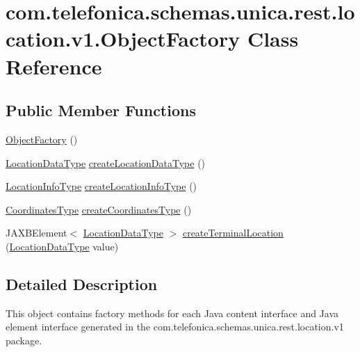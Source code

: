 \hypertarget{classcom_1_1telefonica_1_1schemas_1_1unica_1_1rest_1_1location_1_1v1_1_1ObjectFactory}{
\section{com.telefonica.schemas.unica.rest.location.v1.ObjectFactory Class Reference}
\label{classcom_1_1telefonica_1_1schemas_1_1unica_1_1rest_1_1location_1_1v1_1_1ObjectFactory}
}
\subsection*{Public Member Functions}
\begin{DoxyCompactItemize}
\item 
\hyperlink{classcom_1_1telefonica_1_1schemas_1_1unica_1_1rest_1_1location_1_1v1_1_1ObjectFactory_a7065b25df4fd0546046692b6a4e3af7e}{ObjectFactory} ()
\item 
\hyperlink{classcom_1_1telefonica_1_1schemas_1_1unica_1_1rest_1_1location_1_1v1_1_1LocationDataType}{LocationDataType} \hyperlink{classcom_1_1telefonica_1_1schemas_1_1unica_1_1rest_1_1location_1_1v1_1_1ObjectFactory_a0a78b76f6ff91e78009deda444c2b8f9}{createLocationDataType} ()
\item 
\hyperlink{classcom_1_1telefonica_1_1schemas_1_1unica_1_1rest_1_1location_1_1v1_1_1LocationInfoType}{LocationInfoType} \hyperlink{classcom_1_1telefonica_1_1schemas_1_1unica_1_1rest_1_1location_1_1v1_1_1ObjectFactory_aabe8e41e77b0503c98c8d6abec9b3e8c}{createLocationInfoType} ()
\item 
\hyperlink{classcom_1_1telefonica_1_1schemas_1_1unica_1_1rest_1_1location_1_1v1_1_1CoordinatesType}{CoordinatesType} \hyperlink{classcom_1_1telefonica_1_1schemas_1_1unica_1_1rest_1_1location_1_1v1_1_1ObjectFactory_ae17fe5e38e195783f9294a458e1f18bd}{createCoordinatesType} ()
\item 
JAXBElement$<$ \hyperlink{classcom_1_1telefonica_1_1schemas_1_1unica_1_1rest_1_1location_1_1v1_1_1LocationDataType}{LocationDataType} $>$ \hyperlink{classcom_1_1telefonica_1_1schemas_1_1unica_1_1rest_1_1location_1_1v1_1_1ObjectFactory_aa20b04d00c8d4bf0159d574703da9d98}{createTerminalLocation} (\hyperlink{classcom_1_1telefonica_1_1schemas_1_1unica_1_1rest_1_1location_1_1v1_1_1LocationDataType}{LocationDataType} value)
\end{DoxyCompactItemize}


\subsection{Detailed Description}
This object contains factory methods for each Java content interface and Java element interface generated in the com.telefonica.schemas.unica.rest.location.v1 package. 

